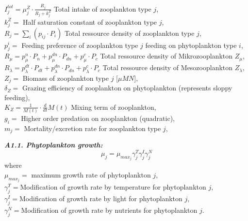 \documentclass[11pt,letterpaper,english]{article}
\begin{document}
\mbox{} \hspace{.5cm} $I^{tot}_j= \mu^{Z}_j⋅\frac{R_{j}}{R_{j} + k^Z_j}$ Total intake of zooplankton type $j$,\\
\mbox{} \hspace{.5cm} $k^Z_j =$ Half saturation constant of zooplankton type $j$,\\
\mbox{} \hspace{.5cm} $R_{j}= \sum_{i} (p_{i j}⋅P_{i})$ Total ressource density of zooplankton type $j$,\\
\mbox{} \hspace{.5cm} $p^i_{j}=$ Feeding preference of zooplankton type $j$ feeding on phytoplankton type $i$,\\
\mbox{} \hspace{.5cm} $R_{\mu}= p^n_{\mu}⋅P_{n} + p^{dn}_{\mu}⋅P_{dn} + p^c_{\mu}⋅P_{c}$ Total ressource density of Mikrozooplankton $Z_{\mu}$,\\
\mbox{} \hspace{.5cm} $R_{\lambda}= p^{dt}_{\lambda}⋅P_{dt} + p^{dn}_{\lambda}⋅P_{dn} + p^c_{\lambda}⋅P_{c}$ Total ressource density of Mesozooplankton $Z_{\lambda}$,\\



\mbox{} \hspace{.5cm} $Z_j=$ Biomass of zooplankton type $j$ [$\mu M N$],\\
\mbox{} \hspace{.5cm} $\delta_{Z}=$ Grazing efficiency of zooplankton on phytoplankton (represents sloppy feeding), \\
\mbox{} \hspace{.5cm} $K_{Z}=\frac{1}{M(t)} \cdot \frac{d}{d t} M(t)$ Mixing term of zooplankton, \\
\mbox{} \hspace{.5cm} $g_{i}=$ Higher order predation on zooplankton (quadratic), \\
\mbox{} \hspace{.5cm} $m_{j}=$ Mortality/excretion rate for zooplankton type $j$,\\




\vspace{.2cm}

{\it {\bf A1.1. Phytoplankton growth:}}\\
\[
\mu_j = \mu_{max_{j}} \gamma_j^T \gamma_j^I \gamma_j^N
\]
where\\
\mbox{} \hspace{.5cm} $\mu_{max_{j}}=$ maximum growth rate of phytoplankton $j$,\\
\mbox{} \hspace{.5cm} $\gamma_j^T=$Modification of growth rate by
temperature for phytoplankton $j$,\\
\mbox{} \hspace{.5cm} $\gamma_j^I=$Modification of growth rate by light for
phytoplankton $j$,\\
\mbox{} \hspace{.5cm} $\gamma_j^N=$Modification of growth rate by nutrients
for phytoplankton $j$.\\
\end{document}
